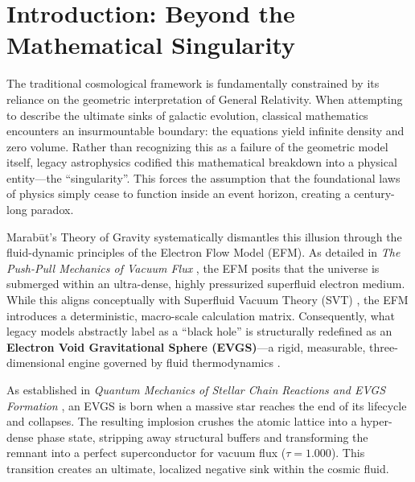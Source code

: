 \documentclass[11pt, a4paper]{article}
\begin{document}
\clearpage
\makeatletter
\renewcommand*\l@subsection{\@dottedtocline{2}{1.5em}{3.2em}} 
\makeatother
\tableofcontents
\clearpage

\section{Introduction: Beyond the Mathematical Singularity}
  The traditional cosmological framework is fundamentally constrained by its reliance on the geometric interpretation of General Relativity. When attempting to describe the ultimate sinks of galactic evolution, classical mathematics encounters an insurmountable boundary: the equations yield infinite density and zero volume. Rather than recognizing this as a failure of the geometric model itself, legacy astrophysics codified this mathematical breakdown into a physical entity---the ``singularity''. This forces the assumption that the foundational laws of physics simply cease to function inside an event horizon, creating a century-long paradox.

  Marab\={u}t's Theory of Gravity systematically dismantles this illusion through the fluid-dynamic principles of the Electron Flow Model (EFM). As detailed in \textit{The Push-Pull Mechanics of Vacuum Flux} \cite{marabut2026m1}, the EFM posits that the universe is submerged within an ultra-dense, highly pressurized superfluid electron medium. While this aligns conceptually with Superfluid Vacuum Theory (SVT) \cite{sinha1975}, the EFM introduces a deterministic, macro-scale calculation matrix. Consequently, what legacy models abstractly label as a ``black hole'' is structurally redefined as an \textbf{Electron Void Gravitational Sphere (EVGS)}---a rigid, measurable, three-dimensional engine governed by fluid thermodynamics \cite{marabut2026m8}. 

  As established in \textit{Quantum Mechanics of Stellar Chain Reactions and EVGS Formation} \cite{marabut2026m4}, an EVGS is born when a massive star reaches the end of its lifecycle and collapses. The resulting implosion crushes the atomic lattice into a hyper-dense phase state, stripping away structural buffers and transforming the remnant into a perfect superconductor for vacuum flux ($\tau = 1.000$). This transition creates an ultimate, localized negative sink within the cosmic fluid.
\end{document}
